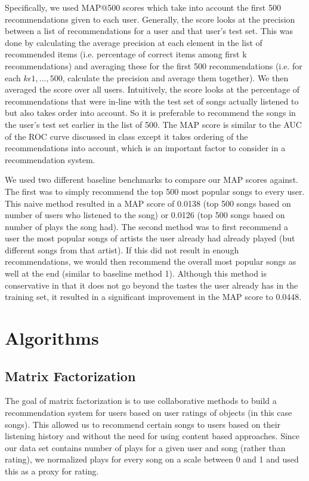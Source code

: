 \documentclass[12pt,preprint]{aastex}
\begin{document}
Specifically, we used MAP@500 scores which take into account the first 500 recommendations given to each user. Generally, the score looks at the precision between a list of recommendations for a user and that user's test set. This was done by calculating the average precision at each element in the list of recommended items (i.e. percentage of correct items among first k recommendations) and averaging these for the first 500 recommendations (i.e. for each $k \epsilon {1, ..., 500}$, calculate the precision and average them together).
We then averaged the score over all users. Intuitively, the score looks at the percentage of recommendations that were in-line with the test set of songs actually listened to but also takes order into account. So it is preferable to recommend the songs in the user's test set earlier in the list of 500. The MAP score is similar to the AUC of the ROC curve discussed in class except it takes ordering of the recommendations into account, which is an important factor to consider in a recommendation system.

We used two different baseline benchmarks to compare our MAP scores against. The first was to simply recommend the top 500 most popular songs to every user. This naive method resulted in a MAP score of 0.0138 (top 500 songs based on number of users who listened to the song) or 0.0126 (top 500 songs based on number of plays the song had). The second method was to first recommend a user the most popular songs of artists the user already had already played (but different songs from that artist). If this did not result in enough recommendations, we would then recommend the overall most popular songs as well at the end (similar to baseline method 1). Although this method is conservative in that it does not go beyond the tastes the user already has in the training set, it resulted in a significant improvement in the MAP score to 0.0448.




\section{Algorithms}

\subsection{Matrix Factorization}
The goal of matrix factorization is to use collaborative methods to build a recommendation system for users based on user ratings of objects (in this case songs). This allowed us to recommend certain songs to users based on their listening history and without the need for using content based approaches. Since our data set contains number of plays for a given user and song (rather than rating), we normalized plays for every song on a scale between 0 and 1 and used this as a proxy for rating. 
\end{document}

